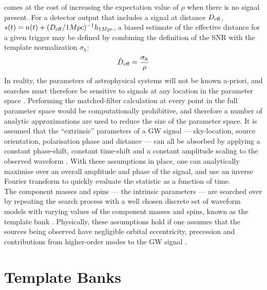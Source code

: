\documentclass[binding=0.6cm, LaM]{sapthesis}
\begin{document}
	comes at the cost of increasing the expectation value of $\rho$ when there is no signal present. 
	For a detector output that includes a signal at distance $D_{\rm eff}$, 
	$s(t) = n(t) + (D_{\rm eff}/1 Mpc)^{-1}h_{1Mpc}$, 
	a biased estimate of the effective distance for a given trigger 
	may be defined by combining the definition of the SNR with the template normalization $\sigma_h$:
		\begin{equation}
			\hat D_{\rm eff} = {{\sigma_h} \over {\rho}}
		\end{equation}
	In reality, the parameters of astrophysical systems will not be known a-priori, 
	and searches must therefore be sensitive to signals at any location in the parameter space \cite{25}. 
	Performing the matched-filter calculation at every point in the full parameter space 
	would be computationally prohibitive, 
	and therefore a number of analytic approximations are used to reduce the size of the parameter space. 
	It is assumed that the ``extrinsic'' parameters of a GW signal --- 
	sky-location, source orientation, polarisation phase and distance --- 
	can all be absorbed by applying a constant phase-shift, 
	constant time-shift and a constant amplitude scaling to the observed waveform \cite{27}. 
	With these assumptions in place, 
	one can analytically maximise over an overall amplitude and phase of the signal, 
	and use an inverse Fourier transform to quickly evaluate the statistic as a function of time. \\
	The component masses and spins --- the intrinsic parameters --- 
	are searched over by repeating the search process with a well chosen discrete set of waveform models 
	with varying values of the component masses and spins, 
	known as the template bank \cite{27}. 
	Physically, these assumptions hold if one assumes that the sources being observed 
	have negligible orbital eccentricity, precession and contributions from higher-order modes 
	to the GW signal \cite{23}. 

\section{Template Banks}
\end{document}
